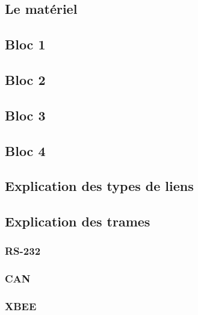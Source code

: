 \documentclass[10pt,a4paper,final]{article}
\begin{document}
\begin{spacing}{1.5}
\section{Le matériel}
\subsection{Bloc 1}

\subsection{Bloc 2}

\subsection{Bloc 3}

\subsection{Bloc 4}



\subsection{Explication des types de liens}



\subsection{Explication des trames}
\subsubsection{RS-232}

\subsubsection{CAN}

\subsubsection{XBEE}





\end{spacing}
\end{document}
